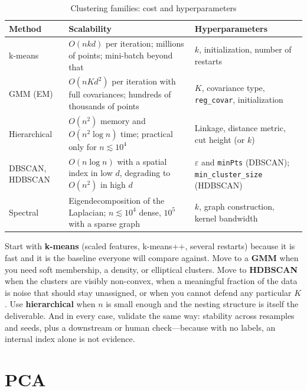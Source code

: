 \begin{table}[H]
\centering
\small
\caption{Clustering families: cost and hyperparameters}
\label{cml:tab:clustering_cost}
\begin{tabularx}{\textwidth}{@{}l X X@{}}
\toprule
\textbf{Method} & \textbf{Scalability} & \textbf{Hyperparameters} \\
\midrule
k-means & $O(nkd)$ per iteration; millions of points; mini-batch beyond that & $k$, initialization, number of restarts \\
GMM (EM) & $O(nKd^2)$ per iteration with full covariances; hundreds of thousands of points & $K$, covariance type, \texttt{reg\_covar}, initialization \\
Hierarchical & $O(n^2)$ memory and $O(n^2\log n)$ time; practical only for $n \lesssim 10^4$ & Linkage, distance metric, cut height (or $k$) \\
DBSCAN, HDBSCAN & $O(n\log n)$ with a spatial index in low $d$, degrading to $O(n^2)$ in high $d$ & $\varepsilon$ and \texttt{minPts} (DBSCAN); \texttt{min\_cluster\_size} (HDBSCAN) \\
Spectral & Eigendecomposition of the Laplacian; $n \lesssim 10^4$ dense, $10^5$ with a sparse graph & $k$, graph construction, kernel bandwidth \\
\bottomrule
\end{tabularx}
\end{table}

\begin{keyinsight}
Start with \textbf{k-means} (scaled features, k-means++, several restarts) because it is fast and it is the baseline everyone will compare against. Move to a \textbf{GMM} when you need soft membership, a density, or elliptical clusters. Move to \textbf{HDBSCAN} when the clusters are visibly non-convex, when a meaningful fraction of the data is noise that should stay unassigned, or when you cannot defend any particular $K$. Use \textbf{hierarchical} when $n$ is small enough and the nesting structure is itself the deliverable. And in every case, validate the same way: stability across resamples and seeds, plus a downstream or human check---because with no labels, an internal index alone is not evidence.
\end{keyinsight}

\section{PCA}
\label{cml:sec:pca}

